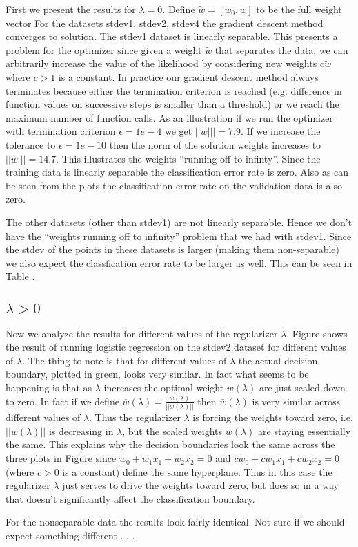 \documentclass[10pt]{article}
\begin{document}
First we present the results for $\lambda = 0$. Define $\tilde{w} = [w_0,w]$ to be the full weight vector For the datasets stdev1, stdev2, stdev4 the gradient descent method converges to solution. The stdev1 dataset is linearly separable. This presents a problem for the optimizer since given a weight $\tilde{w}$ that separates the data, we can arbitrarily increase the value of the likelihood by considering new weights $c \tilde{w}$ where $c > 1$ is a constant. In practice our gradient descent method always terminates because either the termination criterion is reached (e.g. difference in function values on successive steps is smaller than a threshold) or we reach the maximum number of function calls. As an illustration if we run the optimizer with termination criterion $\epsilon = 1e-4$ we get $||\tilde{w}||| = 7.9$. If we increase the tolerance to $\epsilon = 1e-10$ then the norm of the solution weights increases to $||\tilde{w}||| = 14.7$. This illustrates the weights ``running off to infinty''. Since the training data is linearly separable the classification error rate is zero. Also as can be seen from the plots the classification error rate on the validation data is also zero.

The other datasets (other than stdev1) are not linearly separable. Hence we don't have the ``weights running off to infinity'' problem that we had with stdev1. Since the stdev of the points in these datasets is larger (making them non-separable) we also expect the classfication error rate to be larger as well. This can be seen in Table . 

\subsection{$\lambda > 0$}
Now we analyze the results for different values of the regularizer $\lambda$. Figure  shows the result of running logistic regression on the stdev2 dataset for different values of $\lambda$. The thing to note is that for different values of $\lambda$ the actual decision boundary, plotted in green, looks very similar. In fact what seems to be happening is that as $\lambda$ increases the optimal weight $w(\lambda)$ are just scaled down to zero. In fact if we define $\overline{w}(\lambda) = \frac{w(\lambda)}{||w(\lambda)||}$ then $\overline{w}(\lambda)$ is very similar across different values of $\lambda$. Thus the regularizer $\lambda$ is forcing the weights toward zero, i.e. $||w(\lambda)||$ is decreasing in $\lambda$, but the scaled weights $\overline{w}(\lambda)$ are staying essentially the same. This explains why the decision boundaries look the same across the three plots in Figure  since $w_0 + w_1 x_1 + w_2 x_2 = 0$ and $c w_0 + c w_1 x_1 + c w_2 x_2 = 0$ (where $c > 0$ is a constant) define the same hyperplane. Thus in this case the regularizer $\lambda$ just serves to drive the weights toward zero, but does so in a way that doesn't significantly affect the classification boundary. 

For the nonseparable data the results look fairly identical. Not sure if we should expect something different . . . 
\end{document}
